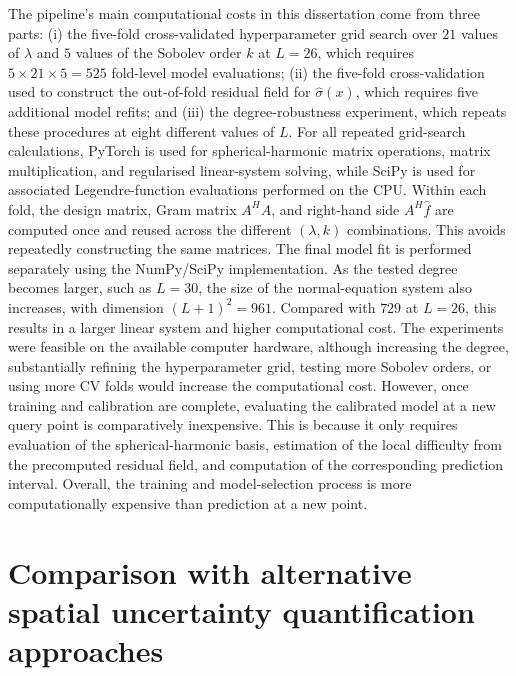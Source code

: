 The pipeline's main computational costs in this dissertation come from three parts: (i) the five-fold cross-validated hyperparameter grid search over $21$ values of $\lambda$ and $5$ values of the Sobolev order $k$ at $L=26$, which requires $5\times21\times5=525$ fold-level model evaluations; (ii) the five-fold cross-validation used to construct the out-of-fold residual field for $\hat\sigma(x)$, which requires five additional model refits; and (iii) the degree-robustness experiment, which repeats these procedures at eight different values of $L$. For all repeated grid-search calculations, PyTorch is used for spherical-harmonic matrix operations, matrix multiplication, and regularised linear-system solving, while SciPy is used for associated Legendre-function evaluations performed on the CPU. Within each fold, the design matrix, Gram matrix $A^HA$, and right-hand side $A^H\hat f$ are computed once and reused across the different $(\lambda,k)$ combinations. This avoids repeatedly constructing the same matrices. The final model fit is performed separately using the NumPy/SciPy implementation. As the tested degree becomes larger, such as $L=30$, the size of the normal-equation system also increases, with dimension $(L+1)^2=961$. Compared with $729$ at $L=26$, this results in a larger linear system and higher computational cost. The experiments were feasible on the available computer hardware, although increasing the degree, substantially refining the hyperparameter grid, testing more Sobolev orders, or using more CV folds would increase the computational cost. However, once training and calibration are complete, evaluating the calibrated model at a new query point is comparatively inexpensive. This is because it only requires evaluation of the spherical-harmonic basis, estimation of the local difficulty from the precomputed residual field, and computation of the corresponding prediction interval. Overall, the training and model-selection process is more computationally expensive than prediction at a new point.
 
\section{Comparison with alternative spatial uncertainty quantification approaches}

